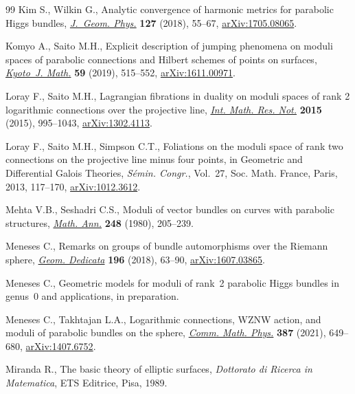 \documentclass[pdftex]{sigma}
\numberwithin{equation}{section}
\begin{document}
\begin{thebibliography}{99}
Kim S., Wilkin G., Analytic convergence of harmonic metrics for parabolic
 {H}iggs bundles, \href{https://doi.org/10.1016/j.geomphys.2018.01.023}{\textit{J.~Geom. Phys.}} \textbf{127} (2018), 55--67,
 \href{https://arxiv.org/abs/1705.08065}{arXiv:1705.08065}.

Komyo A., Saito M.H., Explicit description of jumping phenomena on moduli
 spaces of parabolic connections and {H}ilbert schemes of points on surfaces,
 \href{https://doi.org/10.1215/21562261-2019-0016}{\textit{Kyoto~J. Math.}} \textbf{59} (2019), 515--552, \href{https://arxiv.org/abs/1611.00971}{arXiv:1611.00971}.

Loray F., Saito M.H., Lagrangian fibrations in duality on moduli spaces of rank
 2 logarithmic connections over the projective line, \href{https://doi.org/10.1093/imrn/rnt232}{\textit{Int. Math. Res.
 Not.}} \textbf{2015} (2015), 995--1043, \href{https://arxiv.org/abs/1302.4113}{arXiv:1302.4113}.

Loray F., Saito M.H., Simpson C.T., Foliations on the moduli space of rank two
 connections on the projective line minus four points, in Geometric and
 Differential {G}alois Theories, \textit{S\'emin. Congr.}, Vol.~27, Soc. Math.
 France, Paris, 2013, 117--170, \href{https://arxiv.org/abs/1012.3612}{arXiv:1012.3612}.

Mehta V.B., Seshadri C.S., Moduli of vector bundles on curves with parabolic
 structures, \href{https://doi.org/10.1007/BF01420526}{\textit{Math. Ann.}} \textbf{248} (1980), 205--239.

Meneses C., Remarks on groups of bundle automorphisms over the {R}iemann
 sphere, \href{https://doi.org/10.1007/s10711-017-0309-y}{\textit{Geom. Dedicata}} \textbf{196} (2018), 63--90,
 \href{https://arxiv.org/abs/1607.03865}{arXiv:1607.03865}.

Meneses C., Geometric models for moduli of rank~2 parabolic {H}iggs bundles in
 genus~0 and applications, {i}n preparation.

Meneses C., Takhtajan L.A., Logarithmic connections, {WZNW} action, and moduli
 of parabolic bundles on the sphere, \href{https://doi.org/10.1007/s00220-021-04183-y}{\textit{Comm. Math. Phys.}} \textbf{387}
 (2021), 649--680, \href{https://arxiv.org/abs/1407.6752}{arXiv:1407.6752}.

Miranda R., The basic theory of elliptic surfaces, \textit{Dottorato di Ricerca in
 Matematica}, ETS Editrice, Pisa, 1989.


\end{thebibliography}
\end{document}
